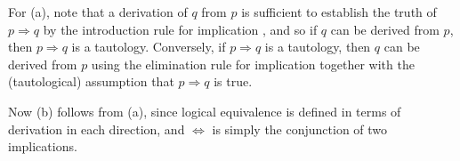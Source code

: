 \begin{cproof}
For (a), note that a derivation of $q$ from $p$ is sufficient to establish the truth of $p \Rightarrow q$ by the introduction rule for implication \introrule{\Rightarrow}, and so if $q$ can be derived from $p$, then $p \Rightarrow q$ is a tautology. Conversely, if $p \Rightarrow q$ is a tautology, then $q$ can be derived from $p$ using the elimination rule for implication \elimrule{\Rightarrow} together with the (tautological) assumption that $p \Rightarrow q$ is true.

Now (b) follows from (a), since logical equivalence is defined in terms of derivation in each direction, and $\Leftrightarrow$ is simply the conjunction of two implications.
\end{cproof}


